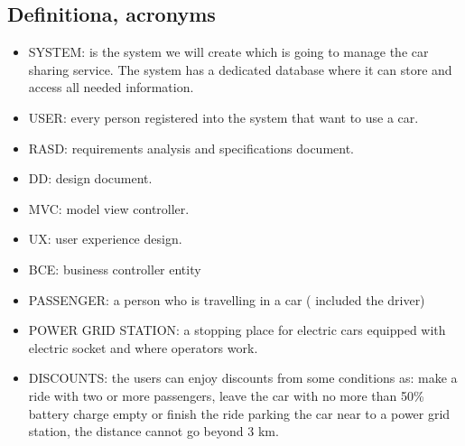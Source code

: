 \documentclass{article}
\begin{document}
\begin{flushleft}
\subsection{Definitiona, acronyms} %
\begin {itemize}
\item SYSTEM: is the system we will create which is going to manage the car sharing service. The system has a dedicated database where it can store and access all needed information.

\item USER: every person registered into the system that want to use a car.
\item RASD: requirements analysis and specifications document.

\item DD: design document.

\item MVC: model view controller.
\item UX:  user experience design.
\item BCE: business controller entity
\item PASSENGER:  a person who is travelling in a car ( included the driver)
\item POWER GRID STATION: a stopping place for electric cars equipped with electric socket and where operators work.
\item DISCOUNTS: the users can enjoy discounts from some conditions as: make a ride with two or more passengers, leave the car with no more than 50\% battery charge empty or finish the ride parking the car near to a power grid station, the distance cannot go beyond 3 km.


\end{itemize}
\end{flushleft}
\end{document}
